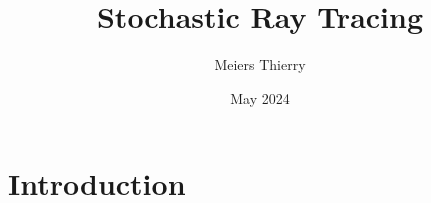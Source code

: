 \documentclass[a4paper, 12pt, onepage]{report}
\title{Stochastic Ray Tracing}
\author{Meiers Thierry}
\date{May 2024}
\begin{document}
\makeTitleAndTable

\section{Introduction}
\end{document}
